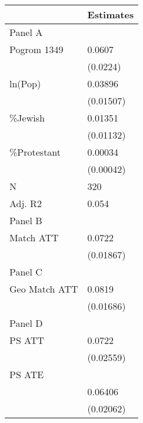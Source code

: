 
\begin{tabular}{ll}
\toprule
  & Estimates\\
\midrule
Panel A & \\
Pogrom 1349 & 0.0607\\
 & (0.0224)\\
ln(Pop) & 0.03896\\
 & (0.01507)\\
\addlinespace
\%Jewish & 0.01351\\
 & (0.01132)\\
\%Protestant & 0.00034\\
 & (0.00042)\\
N & 320\\
\addlinespace
Adj. R2 & 0.054\\
Panel B & \\
Match ATT & 0.0722\\
 & (0.01867)\\
Panel C & \\
\addlinespace
Geo Match ATT & 0.0819\\
 & (0.01686)\\
Panel D & \\
PS ATT & 0.0722\\
 & (0.02559)\\
\addlinespace
PS ATE & \\
 & 0.06406\\
 & (0.02062)\\
\bottomrule
\end{tabular}
